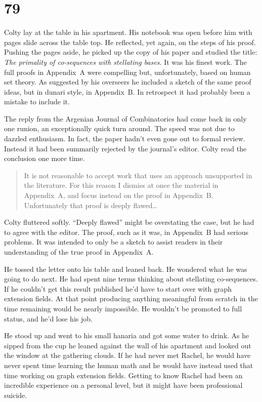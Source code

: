
\chapter{79}

Colty lay at the table in his apartment. His notebook was open before him with pages slide
across the table top. He reflected, yet again, on the steps of his proof. Pushing the pages
aside, he picked up the copy of his paper and studied the title: \textit{The primality of
  co-sequences with stellating bases}. It was his finest work. The full proofs in Appendix~A
were compelling but, unfortunately, based on human set theory. As suggested by his overseers he
included a sketch of the same proof ideas, but in dunari style, in Appendix~B. In retrospect it
had probably been a mistake to include it.

The reply from the Argenian Journal of Combinatorics had come back in only one runion, an
exceptionally quick turn around. The speed was not due to dazzled enthusiasm. In fact, the paper
hadn't even gone out to formal review. Instead it had been summarily rejected by the journal's
editor. Colty read the conclusion one more time.

\begin{quote}
  It is not reasonable to accept work that uses an approach unsupported in the literature. For
  this reason I dismiss at once the material in Appendix~A, and focus instead on the proof in
  Appendix~B. Unfortunately that proof is deeply flawed\ldots
\end{quote}

Colty fluttered softly. ``Deeply flawed'' might be overstating the case, but he had to agree
with the editor. The proof, such as it was, in Appendix~B had serious problems. It was intended
to only be a sketch to assist readers in their understanding of the true proof in Appendix~A.

He tossed the letter onto his table and leaned back. He wondered what he was going to do next.
He had spent nine terms thinking about stellating co-sequences. If he couldn't get this result
published he'd have to start over with graph extension fields. At that point producing anything
meaningful from scratch in the time remaining would be nearly impossible. He wouldn't be
promoted to full status, and he'd lose his job.

He stood up and went to his small hanaria and got some water to drink. As he sipped from the cup
he leaned against the wall of his apartment and looked out the window at the gathering clouds.
If he had never met Rachel, he would have never spent time learning the human math and he would
have instead used that time working on graph extension fields. Getting to know Rachel had been
an incredible experience on a personal level, but it might have been professional suicide.


